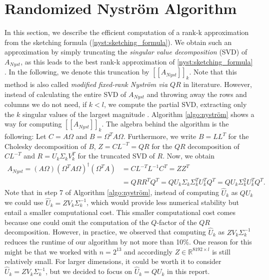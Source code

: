 \documentclass{article}
\theoremstyle{definition}
\begin{document}
\section{Randomized Nyström Algorithm}\label{sec:rand_nystrom_alg}
In this section, we describe the efficient computation of a rank-k approximation from the sketching formula (\ref{nyst:sketching_formula}). We obtain such an approximation by simply truncating the \textit{singular value decomposition} (SVD) of $A_{Nyst}$, as this leads to the best rank-k approximation of \eqref{nyst:sketching_formula} \cite{tropp2017fixedrank}. In the following, we denote this truncation by $[\![A_{Nyst}]\!]_k$. Note that this method is also called \textit{modified fixed-rank Nyström via $QR$} in literature. However, instead of calculating the entire SVD of $A_{Nyst}$ and throwing away the rows and columns we do not need, if $k<l$, we compute the partial SVD, extracting only the $k$ singular values of the largest magnitude \cite{scipy_svds}. Algorithm \ref{algo:nyström} shows a way for computing $[\![A_{Nyst}]\!]_k$. The algebra behind the algorithm is the following: Let $C = A \Omega$ and $B = \Omega^T A \Omega$. Furthermore, we write $B = LL^T$ for the Cholesky decomposition of $B$, $Z = C L^{-T} = QR$ for the $QR$ decomposition of $C L^{-T}$ and $R = U_k \Sigma_k V_k^T$ for the truncated SVD of $R$. Now, we obtain
\begin{align*}
    A_{Nyst} = (A \Omega) (\Omega^T A \Omega)^\dagger (\Omega^T A) &= CL^{-T}L^{-1}C^T = ZZ^T \\
    &= QRR^TQ^T = QU_k\Sigma_k \Sigma_k^T U_k^TQ^T = QU_k\Sigma_k^2 U_k^TQ^T.
\end{align*}
 Note that in step 7 of Algorithm \ref{algo:nyström}, instead of computing $\hat{U}_k$ as $Q U_k$ we could use $\hat{U}_k = Z V_k \Sigma_k^{-1}$, which would provide less numerical stability but entail a smaller computational cost. This smaller computational cost comes because one could omit the computation of the $Q$-factor of the $QR$ decomposition. However, in practice, we observed that computing $\hat{U}_k$ as $Z V_k \Sigma_k^{-1}$ reduces the runtime of our algorithm by not more than 10\%. One reason for this might be that we worked with $n=2^{13}$ and accordingly $Z \in \mathbb{R}^{8192 \times l}$ is still relatively small. For larger dimensions, it could be worth it to consider $\hat{U}_k = Z V_k \Sigma_k^{-1}$, but we decided to focus on $\hat{U}_k = Q U_k$ in this report.
 
\end{document}
